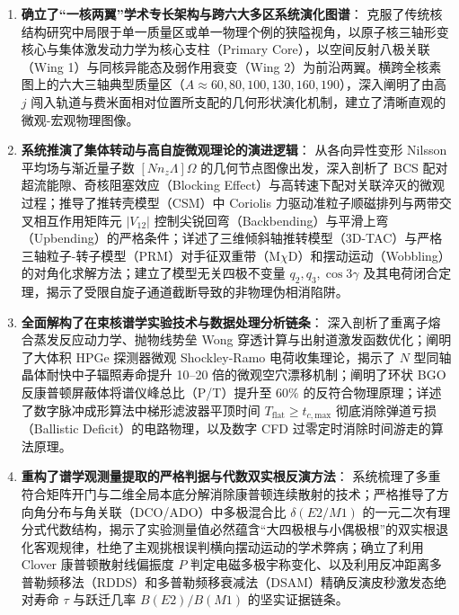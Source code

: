 \begin{enumerate}
    \item \textbf{确立了“一核两翼”学术专长架构与跨六大多区系统演化图谱}：
    克服了传统核结构研究中局限于单一质量区或单一物理个例的狭隘视角，以原子核三轴形变核心与集体激发动力学为核心支柱（Primary Core），以空间反射八极关联（Wing 1）与同核异能态及弱作用衰变（Wing 2）为前沿两翼。横跨全核素图上的六大三轴典型质量区（$A \approx 60, 80, 100, 130, 160, 190$），深入阐明了由高 $j$ 闯入轨道与费米面相对位置所支配的几何形状演化机制，建立了清晰直观的微观-宏观物理图像。

    \item \textbf{系统推演了集体转动与高自旋微观理论的演进逻辑}：
    从各向异性变形 Nilsson 平均场与渐近量子数 $[N n_z \Lambda]\Omega$ 的几何节点图像出发，深入剖析了 BCS 配对超流能隙、奇核阻塞效应（Blocking Effect）与高转速下配对关联淬灭的微观过程；推导了推转壳模型（CSM）中 Coriolis 力驱动准粒子顺磁排列与两带交叉相互作用矩阵元 $|V_{12}|$ 控制尖锐回弯（Backbending）与平滑上弯（Upbending）的严格条件；详述了三维倾斜轴推转模型（3D-TAC）与严格三轴粒子-转子模型（PRM）对手征双重带（M$\chi$D）和摆动运动（Wobbling）的对角化求解方法；建立了模型无关四极不变量 $q_2, q_3, \cos 3\gamma$ 及其电荷闭合定理，揭示了受限自旋子通道截断导致的非物理伪相消陷阱。

    \item \textbf{全面解构了在束核谱学实验技术与数据处理分析链条}：
    深入剖析了重离子熔合蒸发反应动力学、抛物线势垒 Wong 穿透计算与出射道激发函数优化；阐明了大体积 HPGe 探测器微观 Shockley-Ramo 电荷收集理论，揭示了 $N$ 型同轴晶体耐快中子辐照寿命提升 10–20 倍的微观空穴漂移机制；阐明了环状 BGO 反康普顿屏蔽体将谱仪峰总比（P/T）提升至 $60\%$ 的反符合物理原理；详述了数字脉冲成形算法中梯形滤波器平顶时间 $T_{\text{flat}} \ge t_{c,\text{max}}$ 彻底消除弹道亏损（Ballistic Deficit）的电路物理，以及数字 CFD 过零定时消除时间游走的算法原理。

    \item \textbf{重构了谱学观测量提取的严格判据与代数双实根反演方法}：
    系统梳理了多重符合矩阵开门与二维全局本底分解消除康普顿连续散射的技术；严格推导了方向角分布与角关联（DCO/ADO）中多极混合比 $\delta(E2/M1)$ 的一元二次有理分式代数结构，揭示了实验测量值必然蕴含“大四极根与小偶极根”的双实根退化客观规律，杜绝了主观挑根误判横向摆动运动的学术弊病；确立了利用 Clover 康普顿散射线偏振度 $P$ 判定电磁多极宇称变化、以及利用反冲距离多普勒频移法（RDDS）和多普勒频移衰减法（DSAM）精确反演皮秒激发态绝对寿命 $\tau$ 与跃迁几率 $B(E2)/B(M1)$ 的坚实证据链条。
\end{enumerate}

